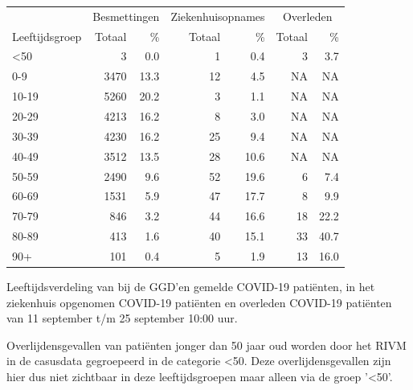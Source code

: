 \documentclass[
  english,
  man,floatsintext]{apa6}
\begin{document}
\begin{table}
\centering\begingroup\fontsize{11}{13}\selectfont

\begin{threeparttable}
\begin{tabular}{lrrrrrr}
\toprule
\multicolumn{1}{c}{ } & \multicolumn{2}{c}{Besmettingen} & \multicolumn{2}{c}{Ziekenhuisopnames} & \multicolumn{2}{c}{Overleden} \\
\cmidrule(l{3pt}r{3pt}){2-3} \cmidrule(l{3pt}r{3pt}){4-5} \cmidrule(l{3pt}r{3pt}){6-7}
Leeftijdsgroep & Totaal & \% & Totaal & \% & Totaal & \%\\
\midrule
<50 & 3 & 0.0 & 1 & 0.4 & 3 & 3.7\\
0-9 & 3470 & 13.3 & 12 & 4.5 & NA & NA\\
10-19 & 5260 & 20.2 & 3 & 1.1 & NA & NA\\
20-29 & 4213 & 16.2 & 8 & 3.0 & NA & NA\\
30-39 & 4230 & 16.2 & 25 & 9.4 & NA & NA\\
40-49 & 3512 & 13.5 & 28 & 10.6 & NA & NA\\
50-59 & 2490 & 9.6 & 52 & 19.6 & 6 & 7.4\\
60-69 & 1531 & 5.9 & 47 & 17.7 & 8 & 9.9\\
70-79 & 846 & 3.2 & 44 & 16.6 & 18 & 22.2\\
80-89 & 413 & 1.6 & 40 & 15.1 & 33 & 40.7\\
90+ & 101 & 0.4 & 5 & 1.9 & 13 & 16.0\\
\bottomrule
\end{tabular}
\begin{tablenotes}
\item[1] Leeftijdsverdeling van bij de GGD’en gemelde COVID-19 patiënten, in het ziekenhuis opgenomen COVID-19 patiënten en overleden COVID-19 patiënten van 11 september t/m 25 september 10:00 uur.
\item[2] Overlijdensgevallen van patiënten jonger dan 50 jaar oud worden door het RIVM in de casusdata gegroepeerd in de categorie <50. Deze overlijdensgevallen zijn hier dus niet zichtbaar in deze leeftijdsgroepen maar alleen via de groep '<50'.
\end{tablenotes}
\end{threeparttable}
\endgroup{}
\end{table}

\newpage
\end{document}
